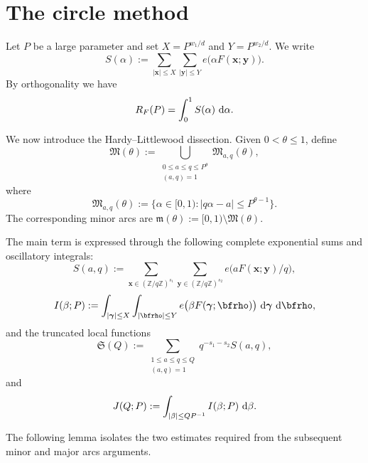 \documentclass[12pt,reqno]{amsart}
\theoremstyle{definition}
\theoremstyle{remark}
\numberwithin{equation}{section}
\def\bfx{{\mathbf x}}
\def\bfy{{\mathbf y}}
\def\Z{{\mathbb Z}}\def\Q{{\mathbb Q}}
\def\grm{{\mathfrak m}}\def\grM{{\mathfrak M}}
\def\grS{{\mathfrak S}}\def\grP{{\mathfrak P}}
\def\a{{\alpha}} \def\bfalp{{\boldsymbol \alpha}} \def\atil{{\widetilde \alpha}}
\def\b{{\beta}}  \def\bfbet{{\boldsymbol \beta}}
\def\gam{{\gamma}} \def\Gam{{\Gamma}}
\def\bfgam{{\boldsymbol \gam}} \def\bfgamhat{{\widehat{\bfgam}}}
\def\d{{\,{\rm d}}}
\begin{document}
\bigskip


\section{The circle method}\label{sec:circle method}
Let $P$ be a large parameter and set $X=P^{w_1/d}$ and $Y=P^{w_2/d}$.
We write
\[
S(\a):=\sum_{|\bfx|\leq X}\sum_{|\bfy|\leq Y}
e\bigl(\a F(\bfx;\bfy)\bigr).
\]
By orthogonality we have 
\[R_F(P)=\int_0^1S(\a)\,\d\a.\]

We now introduce the Hardy--Littlewood dissection. Given
$0<\theta\leq1$, define
\[
\grM(\theta):=\bigcup_{\substack{0\leq a\leq q\leq P^\theta\\(a,q)=1}}
\grM_{a,q}(\theta),
\]
where
\[
\grM_{a,q}(\theta):=\{\a\in[0,1):|q\a-a|\leq P^{\theta-1}\}.
\]
The corresponding minor arcs are
$\grm(\theta):=[0,1)\setminus\grM(\theta)$.

The main term is expressed through the following complete exponential
sums and oscillatory integrals:
\[
S(a,q):=\sum_{\bfx\in(\Z/q\Z)^{s_1}}
\sum_{\bfy\in(\Z/q\Z)^{s_2}}e\bigl(aF(\bfx;\bfy)/q\bigr),
\]
\[
I(\b;P):=\int_{|\bfgam|\leq X}\int_{|\bfrho|\leq Y}
e\bigl(\b F(\bfgam;\bfrho)\bigr)\,\d\bfgam\,\d\bfrho,
\]
and the truncated local functions
\[
\grS(Q):=\sum_{\substack{1\leq a\leq q\leq Q\\(a,q)=1}}
q^{-s_1-s_2}S(a,q),
\]
and
\[
J(Q;P):=\int_{|\b|\leq QP^{-1}}I(\b;P)\,\d\b.
\]

The following lemma isolates the two estimates required from the subsequent
minor and major arcs arguments.
\end{document}

